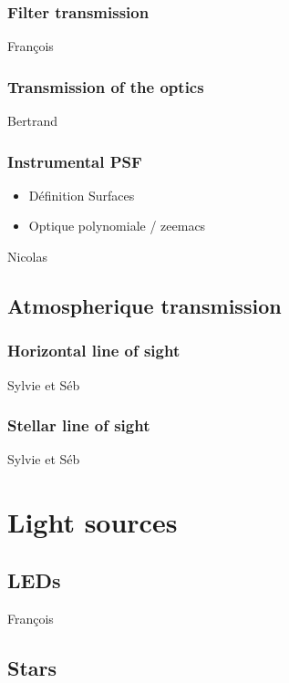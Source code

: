 \documentclass[\docopts]{\docclass}
\begin{document}
\subsubsection{Filter transmission}
\label{sec:filters}
François

\subsubsection{Transmission of the optics}
\label{sec:optics}
Bertrand

\subsubsection{Instrumental PSF}
\label{sec:PSF}
\begin{itemize}
\item Définition Surfaces
\item Optique polynomiale / zeemacs
\end{itemize}

Nicolas

\subsection{Atmospherique transmission}
\label{sec:atmosphere}

\subsubsection{Horizontal line of sight}
\label{sec:hline}

Sylvie et Séb

\subsubsection{Stellar line of sight}
\label{sec:av}

Sylvie et Séb

\section{Light sources}
\label{sec:sources}

\subsection{LEDs}
\label{sec:leds}

François

\subsection{Stars}
\label{sec:stars}
\end{document}
